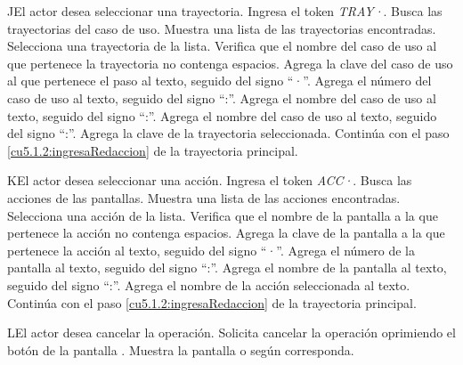  \begin{UCtrayectoriaA}{J}{El actor desea seleccionar una trayectoria.}
 	\UCpaso[\UCactor] Ingresa el token {\it TRAY·}.
	\UCpaso[\UCsist] Busca las trayectorias del caso de uso.
  	\UCpaso[\UCsist] Muestra una lista de las trayectorias encontradas.
 	\UCpaso[\UCactor] Selecciona una trayectoria de la lista.
  	\UCpaso[\UCsist] Verifica que el nombre del caso de uso al que pertenece la trayectoria no contenga espacios. 
  	\UCpaso[\UCsist] Agrega la clave del caso de uso al que pertenece el paso al texto, seguido del signo ``·''.
  	\UCpaso[\UCsist] Agrega el número del caso de uso al texto, seguido del signo ``:''.
  	\UCpaso[\UCsist] Agrega el nombre del caso de uso al texto, seguido del signo ``:''.
  	\UCpaso[\UCsist] Agrega el nombre del caso de uso al texto, seguido del signo ``:''.
  	\UCpaso[\UCsist] Agrega la clave de la trayectoria seleccionada.
    \UCpaso[] Continúa con el paso \ref{cu5.1.2:ingresaRedaccion} de la trayectoria principal.
 \end{UCtrayectoriaA}
 \begin{UCtrayectoriaA}{K}{El actor desea seleccionar una acción.}
 	\UCpaso[\UCactor] Ingresa el token {\it ACC·}.
	\UCpaso[\UCsist] Busca las acciones de las pantallas.
  	\UCpaso[\UCsist] Muestra una lista de las acciones encontradas.
 	\UCpaso[\UCactor] Selecciona una acción de la lista.
  	\UCpaso[\UCsist] Verifica que el nombre de la pantalla a la que pertenece la acción no contenga espacios. 
  	\UCpaso[\UCsist] Agrega la clave de la pantalla a la que pertenece la acción al texto, seguido del signo ``·''.
  	\UCpaso[\UCsist] Agrega el número de la pantalla al texto, seguido del signo ``:''.
  	\UCpaso[\UCsist] Agrega el nombre de la pantalla al texto, seguido del signo ``:''.
  	\UCpaso[\UCsist] Agrega el nombre de la acción seleccionada al texto.
    \UCpaso[] Continúa con el paso \ref{cu5.1.2:ingresaRedaccion} de la trayectoria principal.
 \end{UCtrayectoriaA}

 \begin{UCtrayectoriaA}{L}{El actor desea cancelar la operación.}
    \UCpaso[\UCactor] Solicita cancelar la operación oprimiendo el botón  de la pantalla .
    \UCpaso[\UCsist] Muestra la pantalla  o  según corresponda.
 \end{UCtrayectoriaA}
 
